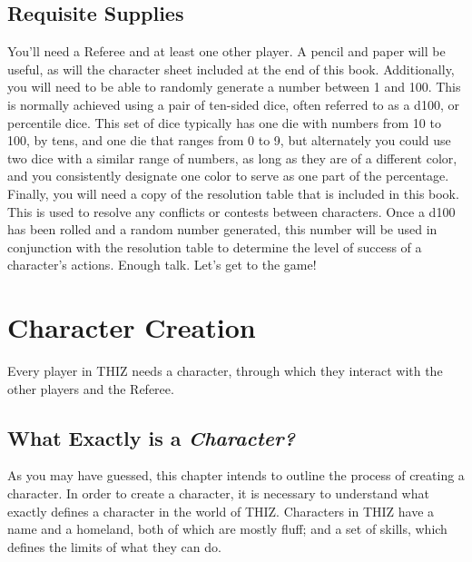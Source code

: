 \documentclass[oneside]{book}
\begin{document}
\section*{Requisite Supplies}

You'll need a Referee and at least one other player. A pencil and paper will be useful, as will the character sheet included at the end of this book. Additionally, you will need to be able to randomly generate a number between 1 and 100. This is normally achieved using a pair of ten-sided dice, often referred to as a d100, or percentile dice.  This set of dice typically has one die with numbers from 10 to 100, by tens, and one die that ranges from 0 to 9, but alternately you could use two dice with a similar range of numbers, as long as they are of a different color, and you consistently designate one color to serve as one part of the percentage. Finally, you will need a copy of the resolution table that is included in this book. This is used to resolve any conflicts or contests between characters. Once a d100 has been rolled and a random number generated, this number will be used in conjunction with the resolution table to determine the level of success of a character's actions. Enough talk. Let's get to the game!

\mainmatter
{}

\chapter{Character Creation}
Every player in THIZ needs a character, through which they interact with the other players and the Referee.

\section{What Exactly is a \emph{Character?}}
As you may have guessed, this chapter intends to outline the process of creating a character. In order to create a character, it is necessary to understand what exactly defines a character in the world of THIZ. Characters in THIZ have a name and a homeland, both of which are mostly fluff; and a set of skills, which defines the limits of what they can do.
\end{document}
